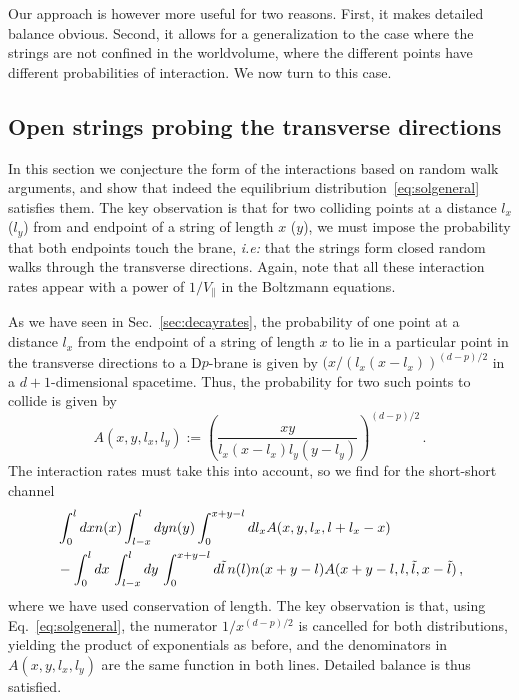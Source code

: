 \documentclass[a4paper,11pt]{article}
\newcommand{\lr}[1]{\left(#1\right)}
\begin{document}
Our approach is however more useful for two reasons.
First, it makes detailed balance obvious.
Second, it allows for a generalization to the case where the strings are not confined in the worldvolume, where the different points have different probabilities of interaction.
We now turn to this case.

\subsection{Open strings probing the transverse directions}

In this section we conjecture the form of the interactions based on random walk arguments, and show that indeed the equilibrium distribution~\eqref{eq:solgeneral} satisfies them.
The key observation is that for two colliding points at a distance $l_x$ ($l_y$) from and endpoint of a string of length $x$ ($y$), we must impose the probability that both endpoints touch the brane, \textit{i.e:} that the strings form closed random walks through the transverse directions. 
Again, note that all these interaction rates appear with a power of $1/V_\|$ in the Boltzmann equations.

As we have seen in Sec.~\ref{sec:decayrates}, the probability of one point at a distance $l_x$ from the endpoint of a string of length $x$ to lie in a particular point in the transverse directions to a D$p$-brane is given by $(x/(l_x(x-l_x))^{(d-p)/2}$ in a $d+1$-dimensional spacetime.
Thus, the probability for two such points to collide is given by 
\begin{equation}
    A(x,y,l_x,l_y) := \lr{\frac{xy}{l_x(x-l_x)l_y(y-l_y)}}^{(d-p)/2}\, .
\end{equation}
The interaction rates must take this into account, so we find for the short-short channel
\begin{equation}
\begin{split}
    &\int_0^l{dxn(x)\int_{l-x}^l{dy n(y)\int_0^{x+y-l}{dl_x A(x,y,l_x,l+l_x-x)}}}\\
    &-\int_0^l{dx\, \int_{l-x}^l{dy\, \int_0^{x+y-l}{d\Tilde{l}\, n(l)n(x+y-l)A(x+y-l,l,\Tilde{l},x-\Tilde{l})}}}\, ,
\end{split}
\end{equation}
where we have used conservation of length.
The key observation is that, using Eq.~\eqref{eq:solgeneral}, the numerator $1/x^{(d-p)/2}$ is cancelled for both distributions, yielding the product of exponentials as before, and the denominators in $A(x,y,l_x,l_y)$ are the same function in both lines.
Detailed balance is thus satisfied.
\end{document}
